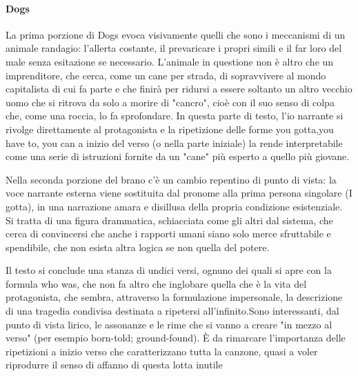 \documentclass[class=book, crop=false, oneside, 12pt]{standalone}
\begin{document}
    \paragraph{Dogs}
    La prima porzione di Dogs evoca visivamente quelli che sono i meccanismi di un animale randagio: l'allerta costante, il prevaricare i propri simili e il far loro del male senza esitazione se necessario. L'animale in questione non è altro che un imprenditore, che cerca, come un cane per strada, di sopravvivere al mondo capitalista di cui fa parte e che finirà per ridursi a essere soltanto un altro vecchio uomo che si ritrova da solo a morire di "cancro", cioè con il suo senso di colpa che, come una roccia, lo fa sprofondare. In questa parte di testo, l'io narrante si rivolge direttamente al protagonista e la ripetizione delle forme you gotta,you have to, you can a inizio del verso (o nella parte iniziale) la rende interpretabile come una serie di istruzioni fornite da un "cane" più esperto a quello più giovane.

    Nella seconda porzione del brano c'è un cambio repentino di punto di vista: la voce narrante esterna viene sostituita dal pronome alla prima persona singolare (I gotta), in una narrazione amara e disillusa della propria condizione esistenziale. Si tratta di una figura drammatica, schiacciata come gli altri dal sistema, che cerca di convincersi che anche i rapporti umani siano solo merce sfruttabile e spendibile, che non esista altra logica se non quella del potere.

    Il testo si conclude una stanza di undici versi, ognuno dei quali si apre con la formula who was, che non fa altro che inglobare quella che è la vita del protagonista, che sembra, attraverso la formulazione impersonale, la descrizione di una tragedia condivisa destinata a ripetersi all'infinito.Sono interessanti, dal punto di vista lirico, le assonanze e le rime che si vanno a creare "in mezzo al verso" (per esempio born-told; ground-found). È da rimarcare l'importanza delle ripetizioni a inizio verso che caratterizzano tutta la canzone, quasi a voler riprodurre il senso di affanno di questa lotta inutile
\end{document}
